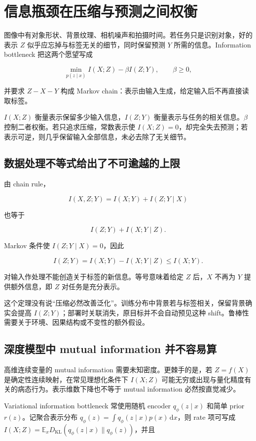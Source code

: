 \section{信息瓶颈在压缩与预测之间权衡}

图像中有对象形状、背景纹理、相机噪声和拍摄时间。若任务只是识别对象，好的表示 \(Z\) 似乎应忘掉与标签无关的细节，同时保留预测 \(Y\) 所需的信息。Information bottleneck 把这两个愿望写成

\[
\min_{p(z\mid x)}
I(X;Z)-\beta I(Z;Y),
\qquad \beta\ge0,
\]

并要求 \(Z-X-Y\) 构成 Markov chain：表示由输入生成，给定输入后不再直接读取标签。

\(I(X;Z)\) 衡量表示保留多少输入信息，\(I(Z;Y)\) 衡量表示与任务的相关信息。\(\beta\) 控制二者权衡。若只追求压缩，常数表示使 \(I(X;Z)=0\)，却完全失去预测；若表示可逆，则几乎保留输入全部信息，未必去除了无关细节。

\subsection{数据处理不等式给出了不可逾越的上限}

由 chain rule，

\[
I(X,Z;Y)
=I(X;Y)+I(Z;Y\mid X)
\]

也等于

\[
I(Z;Y)+I(X;Y\mid Z).
\]

Markov 条件使 \(I(Z;Y\mid X)=0\)，因此

\[
I(Z;Y)
=I(X;Y)-I(X;Y\mid Z)
\le I(X;Y).
\]

对输入作处理不能创造关于标签的新信息。等号意味着给定 \(Z\) 后，\(X\) 不再为 \(Y\) 提供额外信息，即 \(Z\) 对任务是充分表示。

这个定理没有说``压缩必然改善泛化''。训练分布中背景若与标签相关，保留背景确实会提高 \(I(Z;Y)\)；部署时关联消失，原目标并不会自动预见这种 shift。鲁棒性需要关于环境、因果结构或不变性的额外假设。

\subsection{深度模型中 mutual information 并不容易算}

高维连续变量的 mutual information 需要未知密度。更棘手的是，若 \(Z=f(X)\) 是确定性连续映射，在常见理想化条件下 \(I(X;Z)\) 可能无穷或出现与量化精度有关的病态行为。表示维数下降也不等于 mutual information 必然按直觉减少。

Variational information bottleneck 常使用随机 encoder \(q_\phi(z\mid x)\) 和简单 prior \(r(z)\)。记聚合表示分布 \(q_\phi(z)=\int q_\phi(z\mid x)p(x)\,\mathrm dx\)，则 rate 项可写成 \(I(X;Z)=\mathbb E_xD_{\mathrm{KL}}(q_\phi(z\mid x)\|q_\phi(z))\)，并且

